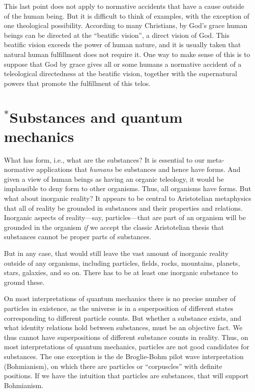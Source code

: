 This last point does not apply to normative accidents that have a cause outside of the human being. But it is difficult to think
of examples, with the exception of one theological possibility. According to many Christians, by God's grace human beings
can be directed at the ``beatific vision'', a direct vision of God. This beatific vision exceeds the power of human
nature, and it is usually taken that natural human fulfillment does not require it. One way to make sense of this is to suppose
that God by grace gives all or some humans a normative accident of a teleological directedness at the beatific vision, together
with the supernatural powers that promote the fulfillment of this telos. 

\section{$^*$Substances and quantum mechanics}
What has form, i.e., what are the substances? 
It is essential to our meta-normative applications that \textit{humans} be substances and hence have forms. And given a view of 
human beings as having an organic teleology, it would be implausible to deny form to other organisms. Thus, all organisms
have forms. But what about inorganic reality? It appears to be central to Aristotelian metaphysics that all of reality be 
grounded in substances and their properties and relations. Inorganic aspects of reality---say, particles---that are 
part of an organism will be grounded in the organism \textit{if} we accept the classic Aristotelian thesis that substances 
cannot be proper parts of substances. 

But in any case, that would still leave the vast amount of inorganic reality outside of any organisms, including particles, 
fields, rocks, mountains, planets, stars, galaxies, and so on. There has to be at least one inorganic substance to ground these.

On most interpretations of quantum mechanics there is no precise number of particles
in existence, as the universe is in a superposition of different states corresponding to different particle counts. But whether 
a substance exists, and what identity relations hold between substances, must be an objective fact. We
thus cannot have superpositions of different substance counts in reality. Thus, on most interpretations of quantum mechanics, particles
are not good candidates for substances. The one exception is the de Broglie-Bohm pilot wave interpretation (Bohmianism), on 
which there are particles or ``corpuscles'' with definite positions. If we have the intuition that particles are substances, 
that will support Bohmianism. 


